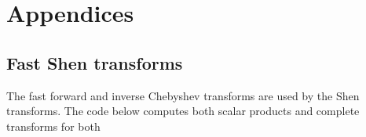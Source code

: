 \documentclass[11pt, oneside]{article}
\begin{document}
%
%
%
%
%


\section{Appendices}
\subsection*{Fast Shen transforms}
The fast forward and inverse Chebyshev transforms are used by the Shen transforms. The code below computes both scalar products and complete transforms for both 
\end{document}
